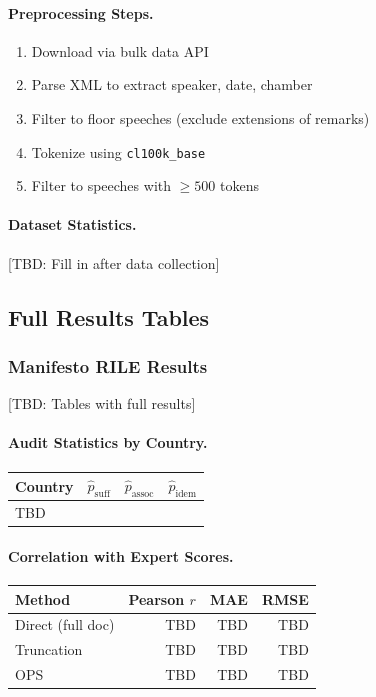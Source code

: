 \paragraph{Preprocessing Steps.}
\begin{enumerate}[nosep]
    \item Download via bulk data API
    \item Parse XML to extract speaker, date, chamber
    \item Filter to floor speeches (exclude extensions of remarks)
    \item Tokenize using \texttt{cl100k\_base}
    \item Filter to speeches with $\ge 500$ tokens
\end{enumerate}

\paragraph{Dataset Statistics.}
[TBD: Fill in after data collection]

\subsection{Full Results Tables}

\subsubsection{Manifesto RILE Results}

[TBD: Tables with full results]

\paragraph{Audit Statistics by Country.}
\begin{center}
\begin{tabular}{lrrr}
\toprule
Country & $\hat{p}_{\text{suff}}$ & $\hat{p}_{\text{assoc}}$ & $\hat{p}_{\text{idem}}$ \\
\midrule
TBD & & & \\
\bottomrule
\end{tabular}
\end{center}

\paragraph{Correlation with Expert Scores.}
\begin{center}
\begin{tabular}{lrrr}
\toprule
Method & Pearson $r$ & MAE & RMSE \\
\midrule
Direct (full doc) & TBD & TBD & TBD \\
Truncation & TBD & TBD & TBD \\
OPS & TBD & TBD & TBD \\
\bottomrule
\end{tabular}
\end{center}


